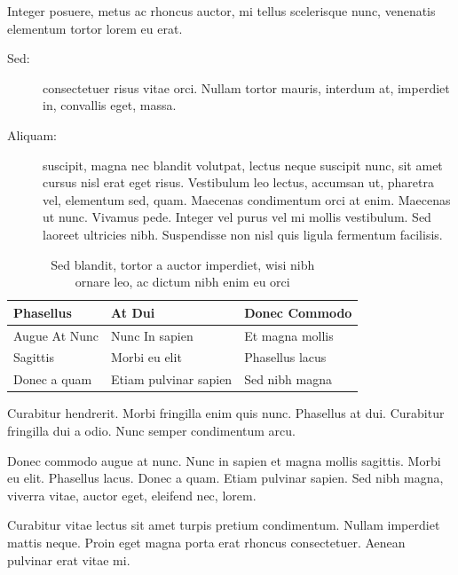 \documentclass[cfonts]{nostarch}
\begin{document}
Integer posuere, metus ac rhoncus auctor, mi tellus scelerisque
nunc, venenatis elementum tortor lorem eu erat.
\begin{description}
\item[Sed:] consectetuer risus vitae orci. Nullam tortor
  mauris, interdum at, imperdiet in, convallis eget, massa.
\item[Aliquam:] suscipit, magna nec blandit volutpat, lectus neque
  suscipit nunc, sit amet cursus nisl erat eget risus.
  Vestibulum leo lectus, accumsan ut, pharetra vel, elementum sed,
  quam. Maecenas condimentum orci at enim. Maecenas ut
  nunc. Vivamus pede. Integer vel purus vel mi mollis
  vestibulum. Sed laoreet ultricies nibh.  Suspendisse non nisl quis
  ligula fermentum facilisis.
\end{description}
\lipsum[37]


\begin{table}[tp]
  \caption[Sed blandit, tortor a auctor]{Sed blandit, tortor a auctor
    imperdiet, wisi nibh\\ ornare leo, 
    ac dictum nibh enim eu orci}
  \tbfont
  \begin{tabular}{@{}lll}
    \toprule\let\normalfont=\bfseries%
    \thfont Phasellus &  \thfont At Dui       & \thfont Donec Commodo \\
    \midrule    
     Augue At Nunc    & Nunc In  sapien       & Et magna mollis \\
     Sagittis         &  Morbi eu elit        &  Phasellus lacus\\
     Donec a quam     & Etiam pulvinar sapien & Sed nibh magna\\
    \bottomrule
  \end{tabular}
\label{tab:one}
\end{table}

\lipsum[60]

Curabitur hendrerit. Morbi fringilla enim quis nunc.
Phasellus at dui. Curabitur fringilla dui a odio.  Nunc
semper condimentum arcu.
\begin{note}
  Donec commodo augue at nunc. Nunc in
  sapien et magna mollis sagittis. Morbi eu elit.
  Phasellus lacus.  Donec a quam. Etiam pulvinar sapien.
  Sed nibh magna, viverra vitae, auctor eget, eleifend
  nec, lorem.
\end{note}
Curabitur vitae lectus sit amet turpis pretium
condimentum. Nullam imperdiet mattis neque. Proin eget magna porta
erat rhoncus consectetuer. Aenean pulvinar erat vitae mi.
\end{document}
